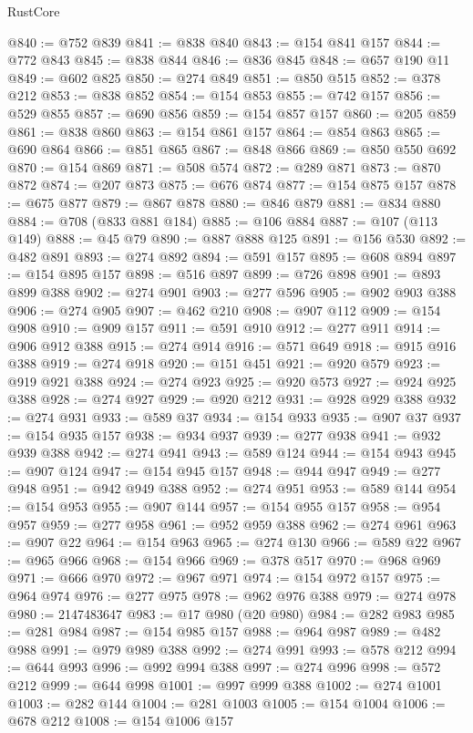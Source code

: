 \begin{lexlean}{RustCore}
\begin{coremodule}
@840 := @752 @839
@841 := @838 @840
@843 := @154 @841 @157
@844 := @772 @843
@845 := @838 @844
@846 := @836 @845
@848 := @657 @190 @11
@849 := @602 @825
@850 := @274 @849
@851 := @850 @515
@852 := @378 @212
@853 := @838 @852
@854 := @154 @853
@855 := @742 @157
@856 := @529 @855
@857 := @690 @856
@859 := @154 @857 @157
@860 := @205 @859
@861 := @838 @860
@863 := @154 @861 @157
@864 := @854 @863
@865 := @690 @864
@866 := @851 @865
@867 := @848 @866
@869 := @850 @550 @692
@870 := @154 @869
@871 := @508 @574
@872 := @289 @871
@873 := @870 @872
@874 := @207 @873
@875 := @676 @874
@877 := @154 @875 @157
@878 := @675 @877
@879 := @867 @878
@880 := @846 @879
@881 := @834 @880
@884 := @708 (@833 @881 @184)
@885 := @106 @884
@887 := @107 (@113 @149)
@888 := @45 @79
@890 := @887 @888 @125
@891 := @156 @530
@892 := @482 @891
@893 := @274 @892
@894 := @591 @157
@895 := @608 @894
@897 := @154 @895 @157
@898 := @516 @897
@899 := @726 @898
@901 := @893 @899 @388
@902 := @274 @901
@903 := @277 @596
@905 := @902 @903 @388
@906 := @274 @905
@907 := @462 @210
@908 := @907 @112
@909 := @154 @908
@910 := @909 @157
@911 := @591 @910
@912 := @277 @911
@914 := @906 @912 @388
@915 := @274 @914
@916 := @571 @649
@918 := @915 @916 @388
@919 := @274 @918
@920 := @151 @451
@921 := @920 @579
@923 := @919 @921 @388
@924 := @274 @923
@925 := @920 @573
@927 := @924 @925 @388
@928 := @274 @927
@929 := @920 @212
@931 := @928 @929 @388
@932 := @274 @931
@933 := @589 @37
@934 := @154 @933
@935 := @907 @37
@937 := @154 @935 @157
@938 := @934 @937
@939 := @277 @938
@941 := @932 @939 @388
@942 := @274 @941
@943 := @589 @124
@944 := @154 @943
@945 := @907 @124
@947 := @154 @945 @157
@948 := @944 @947
@949 := @277 @948
@951 := @942 @949 @388
@952 := @274 @951
@953 := @589 @144
@954 := @154 @953
@955 := @907 @144
@957 := @154 @955 @157
@958 := @954 @957
@959 := @277 @958
@961 := @952 @959 @388
@962 := @274 @961
@963 := @907 @22
@964 := @154 @963
@965 := @274 @130
@966 := @589 @22
@967 := @965 @966
@968 := @154 @966
@969 := @378 @517
@970 := @968 @969
@971 := @666 @970
@972 := @967 @971
@974 := @154 @972 @157
@975 := @964 @974
@976 := @277 @975
@978 := @962 @976 @388
@979 := @274 @978
@980 := 2147483647
@983 := @17 @980 (@20 @980)
@984 := @282 @983
@985 := @281 @984
@987 := @154 @985 @157
@988 := @964 @987
@989 := @482 @988
@991 := @979 @989 @388
@992 := @274 @991
@993 := @578 @212
@994 := @644 @993
@996 := @992 @994 @388
@997 := @274 @996
@998 := @572 @212
@999 := @644 @998
@1001 := @997 @999 @388
@1002 := @274 @1001
@1003 := @282 @144
@1004 := @281 @1003
@1005 := @154 @1004
@1006 := @678 @212
@1008 := @154 @1006 @157

\end{coremodule}
\end{lexlean}
